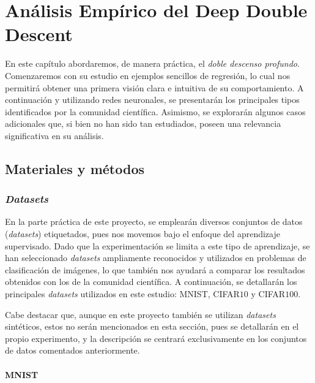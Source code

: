 
\chapter{Análisis Empírico del Deep Double Descent}\label{ch:analisis-empirico-ddd}

En este capítulo abordaremos, de manera práctica, el \textit{doble descenso profundo}. Comenzaremos con su estudio en ejemplos sencillos de regresión, lo cual nos permitirá obtener una primera visión clara e intuitiva de su comportamiento. A continuación y utilizando redes neuronales, se presentarán los principales tipos identificados por la comunidad científica. Asimismo, se explorarán algunos casos adicionales que, si bien no han sido tan estudiados, poseen una relevancia significativa en su análisis.

\section{Materiales y métodos}\label{sec:materiales-y-metodos}

\subsection{\textit{Datasets}}\label{subsec:datasets}

En la parte práctica de este proyecto, se emplearán diversos conjuntos de datos (\textit{datasets}) etiquetados, pues nos movemos bajo el enfoque del aprendizaje supervisado. Dado que la experimentación se limita a este tipo de aprendizaje, se han seleccionado \textit{datasets} ampliamente reconocidos y utilizados en problemas de clasificación de imágenes, lo que también nos ayudará a comparar los resultados obtenidos con los de la comunidad científica. A continuación, se detallarán los principales \textit{datasets} utilizados en este estudio: MNIST, CIFAR$10$ y CIFAR$100$.

Cabe destacar que, aunque en este proyecto también se utilizan \textit{datasets} sintéticos, estos no serán mencionados en esta sección, pues se detallarán en el propio experimento, y la descripción se centrará exclusivamente en los conjuntos de datos comentados anteriormente.

\subsubsection{MNIST}\label{subsubsec:MNIST}


